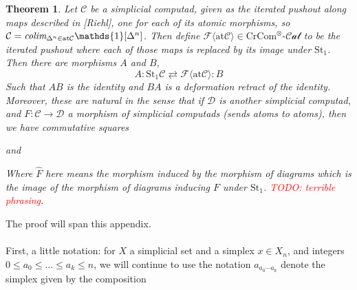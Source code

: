 \documentclass[12pt]{article}
\newtheorem{theorem}{Theorem}[section]
\theoremstyle{definition}
\newcommand{\TODO}[1]{\textcolor{red}{TODO: {#1}}}
\newcommand{\C}{\mathcal{C}}
\newcommand{\D}{\mathcal{D}}
\newcommand{\crcom}{\text{CrCom}}
\newcommand{\tensorcrossedcat}{\crcom^\otimes\text{-}\mathcal{Cat}}
\newcommand{\colim}{\emph{colim}}
\begin{document}
\begin{theorem}
	Let $\C$ be a simplicial computad, given as the iterated pushout along maps described in [Riehl], one for each of its atomic morphisms, so $\C = \colim_{\Delta^n \in \text{at}\C }\mathds{1}[\Delta^n]$. Then define $\mathcal{F}\langle \text{at}\C\rangle \in \tensorcrossedcat$ to be the iterated pushout where each of those maps is replaced by its image under $\text{St}_1$. Then there are morphisms $A$ and $B$,
	$$A: \text{St}_1\C \rightleftarrows \mathcal{F}\langle\text{at} \C \rangle: B$$
	Such that $AB$ is the identity and $BA$ is a deformation retract of the identity. Moreover, these are natural in the sense that if $\D$ is another simplicial computad, and $F: \C \to \D$ a morphism of simplicial computads (sends atoms to atoms), then we have commutative squares 
	\begin{center}
	\end{center}
	and
	\begin{center}
	\end{center}
	Where $\hat{F}$ here means the morphism induced by the morphism of diagrams which is the image of the morphism of diagrams inducing $F$ under $\text{St}_1$. \TODO{terrible phrasing}.
\end{theorem}
The proof will span this appendix.
\\\\
First, a little notation: for $X$ a simplicial set and a simplex $x \in X_n$, and integers $0\le a_0 \le ... \le a_k \le n$, we will continue to use the notation $a_{a_0\cdots a_k}$ denote the simplex given by the composition
\begin{center}
\end{center}
\end{document}
